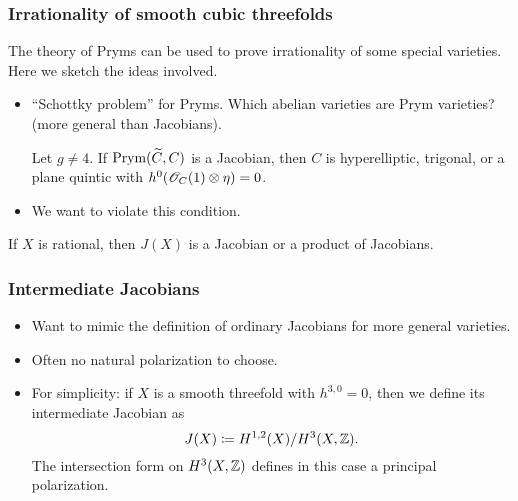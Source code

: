 \begin{frame}
\frametitle{Irrationality of smooth cubic threefolds}

The theory of Pryms can be used to prove irrationality of some special varieties. Here we sketch the ideas involved.
\pause

\begin{itemize}
	\item ``Schottky problem'' for Pryms. Which abelian varieties are Prym varieties? (more general than Jacobians).
	\begin{theorem}[Shokurov]
	Let $g \neq 4$. If $\operatorname{Prym}(\widetilde C, C)$ is a Jacobian, then $C$ is hyperelliptic, trigonal, or a plane quintic with $h^0(\mathscr{O}_C(1) \otimes \eta)=0$. 
	\end{theorem}
	\pause
	\item We want to violate this condition.
\end{itemize}

\begin{theorem}
If $X$ is rational, then $J(X)$ is a Jacobian or a product of Jacobians.
\end{theorem}

\end{frame}

\begin{frame}
\frametitle{Intermediate Jacobians}

\begin{itemize}
	\item Want to mimic the definition of ordinary Jacobians for more general varieties.
	\pause
	\item Often no natural polarization to choose.
	\pause
	\item For simplicity: if $X$ is a smooth threefold with $h^{3,0}=0$, then we define its \alert{intermediate Jacobian} as
	\[
	J(X) \coloneqq H^{1,2}(X)/H^3(X,\mathbb{Z}).
	\]
	The intersection form on $H^3(X,\mathbb{Z})$ defines in this case a principal polarization.
\end{itemize}

\end{frame}

